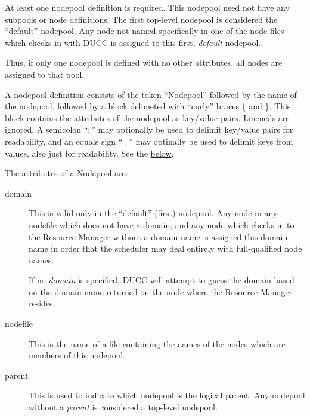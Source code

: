     At least one nodepool definition is required.  This nodepool need not have any subpools or node
    definitions.  The first top-level nodepool is considered the ``default'' nodepool.  Any node not
    named specifically in one of the node files which checks in with DUCC is assigned to this
    first, {\em default} nodepool. 

    Thus, if only one nodepool is defined with no other attributes, all nodes are
    assigned to that pool.

    A nodepool definition consists of the token ``Nodepool'' followed by the 
    name of the nodepool, followed by a block delimeted with ``curly'' braces \{ and \}.  This
    block contains the attributes of the nodepool as key/value pairs.
    Lineneds are ignored.  A semicolon ``$;$'' may optionally be used to
    delimit key/value pairs for readability, and an equals sign ``='' may optinally
    be used to delimit keys from values, also just for readability.  See the 
    \hyperref[fig:nodepool.configuration]{below}.

    The attributes of a Nodepool are:
    \begin{description}
      \item[domain] This is valid only in the ``default'' (first) nodepool.  Any node
        in any nodefile which does not have a domain, and any node which checks
        in to the Resource Manager without a domain name is assigned this domain name
        in order that the scheduler may deal entirely with full-qualified node names.

        If no {\em domain} is specified, DUCC will attempt to guess the domain based
        on the domain name returned on the node where the Resource Manager resides.

      \item[nodefile] This is the name of a file containing the names of the nodes
        which are members of this nodepool.

      \item[parent] This is used to indicate which nodepool is the logical parent.
        Any nodepool without a {\em parent} is considered a top-level nodepool.
    \end{description}
        
